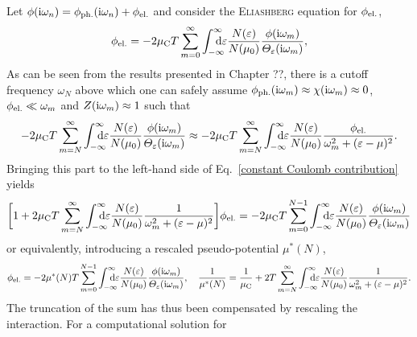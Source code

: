 Let $\phi(\mathrm i \omega_n) = \phi \sb{\text{ph.}} (\mathrm i \omega_n) + \phi \sb{\text{el.}}$ and
consider the \textsc{Eliashberg} equation for $\phi \sb{\text{el.}}$,
%
\begin{equation} \label{constant Coulomb contribution}
    \phi \sub{el.} = -2 \mu \sub C T \sum_{m = 0}^\infty
    \int \from{-\infty} \till \infty \D \epsilon
    \frac{N(\epsilon)}{N(\mu_0)}
    \frac{\phi(\I \omega_m)}{\Theta_\epsilon(\I \omega_m)},
\end{equation}
%
As can be seen from the results presented in Chapter ??, there is a cutoff
frequency $\omega_N$ above which one can safely assume $\phi \sb{\text{ph.}} (\mathrm i
\omega_m) \approx \chi(\mathrm i \omega_m) \approx 0$, $\phi \sb{\text{el.}} \ll \omega_m$
and $Z(\mathrm i \omega_m) \approx 1$ such that
%
\begin{equation*}
    -2 \mu \sub C T \sum_{m = N}^\infty
    \int \from{-\infty} \till \infty \D \epsilon
    \frac{N(\epsilon)}{N(\mu_0)}
    \frac{\phi(\I \omega_m)}{\Theta_\epsilon(\I \omega_m)}
    \approx -2 \mu \sub C T \sum_{m = N}^\infty
    \int \from{-\infty} \till \infty \D \epsilon
    \frac{N(\epsilon)}{N(\mu_0)}
    \frac{\phi \sub{el.}}{\omega_m^2 + (\epsilon - \mu)^2}.
\end{equation*}
%
Bringing this part to the left-hand side of Eq.~\ref{constant Coulomb contribution} yields
%
\begin{equation*}
    \bigg[
        1 + 2 \mu \sub C T \sum_{m = N}^\infty
        \int \from{-\infty} \till \infty \D \epsilon
        \frac{N(\epsilon)}{N(\mu_0)}
        \frac 1 {\omega_m^2 + (\epsilon - \mu)^2}
    \bigg]
    \phi \sub{el.} =
    -2 \mu \sub C T \sum_{m = 0}^{N - 1}
    \int \from{-\infty} \till \infty \D \epsilon
    \frac{N(\epsilon)}{N(\mu_0)}
    \frac{\phi(\I \omega_m)}{\Theta_\epsilon(\I \omega_m)}
\end{equation*}
%
or equivalently, introducing a rescaled pseudo-potential $\mu^*(N)$,
%
\begin{equation*}
    \phi \sub{el.} =
    -2 \mu^*(N) T \sum_{m = 0}^{N - 1}
    \int \from{-\infty} \till \infty \D \epsilon
    \frac{N(\epsilon)}{N(\mu_0)}
    \frac{\phi(\I \omega_m)}{\Theta_\epsilon(\I \omega_m)},
    \quad
    \frac 1 {\mu^*(N)} = \frac 1 {\mu \sub C}
    + 2 T \sum_{m = N}^\infty
    \int \from{-\infty} \till \infty \D \epsilon
    \frac{N(\epsilon)}{N(\mu_0)}
    \frac 1 {\omega_m^2 + (\epsilon - \mu)^2}.
\end{equation*}
%
The truncation of the  sum has thus been compensated by
rescaling the  interaction. For a computational solution for
